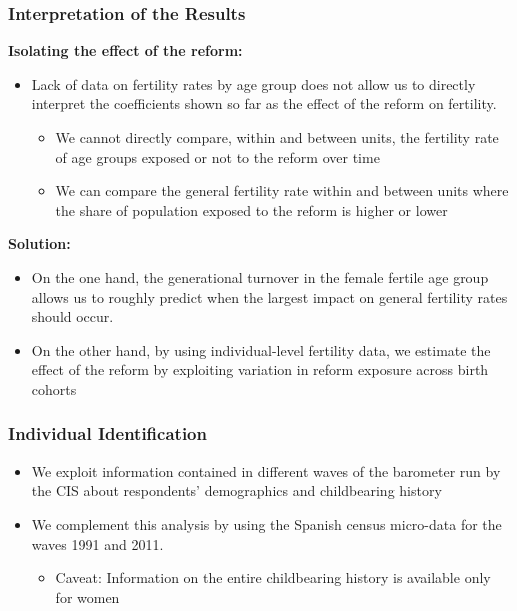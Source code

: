 \documentclass[aspectratio=169]{beamer}
\begin{document}
\begin{frame}[label=empirical2]
\frametitle{Interpretation of the Results}


\textbf{Isolating the effect of the reform:}
\medskip
\begin{itemize}
\item Lack of data on fertility rates by age group does not allow us to directly interpret the coefficients shown so far as the effect of the reform on fertility. 
\begin{itemize}

\medskip
\item We cannot directly compare, within and between units, the fertility rate of age groups exposed or not to the reform over time 
\medskip
\item We can compare the general fertility rate within and between units where the share of population exposed to the reform is higher or lower
\end{itemize}
\end{itemize}
\medskip
\textbf{Solution:}
\begin{itemize}
    \item On the one hand, the generational turnover in the female fertile age group allows us to roughly predict when the largest impact on general fertility rates should occur.
\medskip
\item On the other hand, by using individual-level fertility data, we estimate the effect of the reform by exploiting variation in reform exposure across birth cohorts

\end{itemize}




\end{frame}



\begin{frame}
\frametitle{Individual Identification}
\begin{itemize}
    \item We exploit information contained in different waves of the barometer run by the CIS about respondents' demographics and childbearing history

    \medskip
 \item We complement this analysis by using the Spanish census micro-data for the waves 1991 and 2011.
    \medskip
    \begin{itemize}
        \item Caveat: Information on the entire childbearing history is available only for women
    \end{itemize}
    \end{itemize}
\end{frame}
\end{document}
